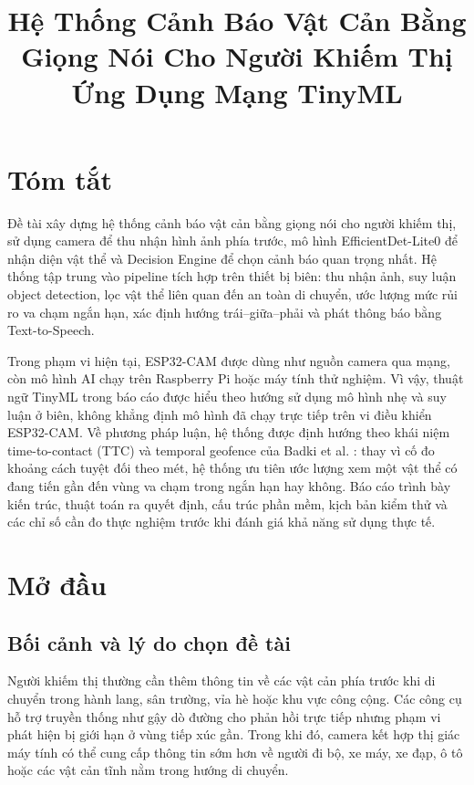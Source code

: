 \documentclass[twoside,final]{hcmut-report}
\title{Hệ Thống Cảnh Báo Vật Cản Bằng Giọng Nói Cho Người Khiếm Thị Ứng Dụng Mạng TinyML}
\begin{document}
\coverpage

\section*{Tóm tắt}
Đề tài xây dựng hệ thống cảnh báo vật cản bằng giọng nói cho người khiếm thị, sử dụng camera để thu nhận hình ảnh phía trước, mô hình EfficientDet-Lite0 để nhận diện vật thể và Decision Engine để chọn cảnh báo quan trọng nhất. Hệ thống tập trung vào pipeline tích hợp trên thiết bị biên: thu nhận ảnh, suy luận object detection, lọc vật thể liên quan đến an toàn di chuyển, ước lượng mức rủi ro va chạm ngắn hạn, xác định hướng trái--giữa--phải và phát thông báo bằng Text-to-Speech.

Trong phạm vi hiện tại, ESP32-CAM được dùng như nguồn camera qua mạng, còn mô hình AI chạy trên Raspberry Pi hoặc máy tính thử nghiệm. Vì vậy, thuật ngữ TinyML trong báo cáo được hiểu theo hướng sử dụng mô hình nhẹ và suy luận ở biên, không khẳng định mô hình đã chạy trực tiếp trên vi điều khiển ESP32-CAM. Về phương pháp luận, hệ thống được định hướng theo khái niệm time-to-contact (TTC) và temporal geofence của Badki et al. \citep{badki2021binaryttc}: thay vì cố đo khoảng cách tuyệt đối theo mét, hệ thống ưu tiên ước lượng xem một vật thể có đang tiến gần đến vùng va chạm trong ngắn hạn hay không. Báo cáo trình bày kiến trúc, thuật toán ra quyết định, cấu trúc phần mềm, kịch bản kiểm thử và các chỉ số cần đo thực nghiệm trước khi đánh giá khả năng sử dụng thực tế.
\clearpage

\tableofcontents
\listoffigures
\listoftables
\clearpage

\section{Mở đầu}

\subsection{Bối cảnh và lý do chọn đề tài}
Người khiếm thị thường cần thêm thông tin về các vật cản phía trước khi di chuyển trong hành lang, sân trường, vỉa hè hoặc khu vực công cộng. Các công cụ hỗ trợ truyền thống như gậy dò đường cho phản hồi trực tiếp nhưng phạm vi phát hiện bị giới hạn ở vùng tiếp xúc gần. Trong khi đó, camera kết hợp thị giác máy tính có thể cung cấp thông tin sớm hơn về người đi bộ, xe máy, xe đạp, ô tô hoặc các vật cản tĩnh nằm trong hướng di chuyển.
\end{document}
